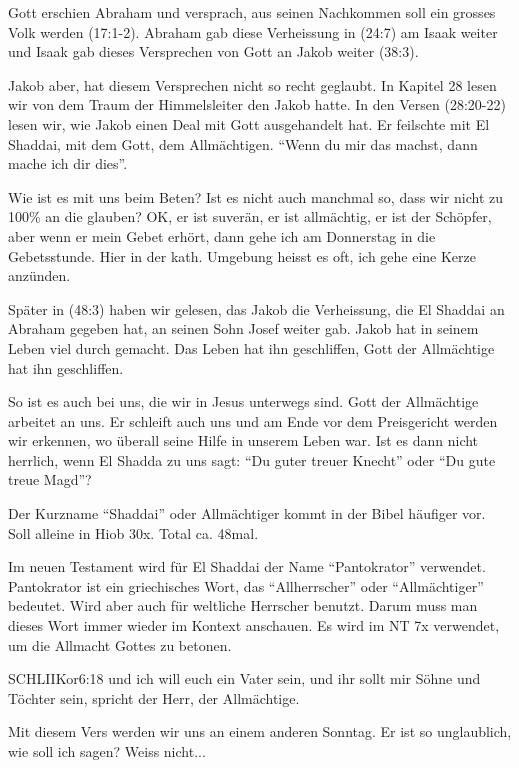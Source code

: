 \begin{otsblock}[Gottesnamen]
    Gott erschien Abraham und versprach, aus seinen Nachkommen soll ein grosses Volk werden (17:1-2). Abraham gab diese Verheissung in (24:7) am Isaak weiter und Isaak gab dieses Versprechen von Gott an Jakob weiter (38:3). 
    
    Jakob aber, hat diesem Versprechen nicht so recht geglaubt. In Kapitel 28 lesen wir von dem Traum der Himmelsleiter den Jakob hatte. In den Versen (28:20-22) lesen wir, wie Jakob einen Deal mit Gott ausgehandelt hat. Er feilschte mit El Shaddai, mit dem Gott, dem Allmächtigen. \enquote{Wenn du mir das machst, dann mache ich dir dies}. 
    
    Wie ist es mit uns beim Beten? Ist es nicht auch manchmal so, dass wir nicht zu 100\% an die  glauben? OK, er ist suverän, er ist allmächtig, er ist der Schöpfer, aber wenn er mein Gebet erhört, dann gehe ich am Donnerstag in die Gebetsstunde. Hier in der kath. Umgebung heisst es oft, ich gehe eine Kerze anzünden.

    Später in (48:3) haben wir gelesen, das Jakob die Verheissung, die El Shaddai an Abraham gegeben hat, an seinen Sohn Josef weiter gab. Jakob hat in seinem Leben viel durch gemacht. Das Leben hat ihn geschliffen, Gott der Allmächtige hat ihn geschliffen. 
    
    So ist es auch bei uns, die wir in Jesus unterwegs sind. Gott der Allmächtige arbeitet an uns. Er schleift auch uns und am Ende vor dem Preisgericht werden wir erkennen, wo überall seine Hilfe in unserem Leben war. Ist es dann nicht herrlich, wenn El Shadda zu uns sagt: \enquote{Du guter treuer Knecht} oder \enquote{Du gute treue Magd}?

    Der Kurzname \enquote{Shaddai} oder Allmächtiger kommt in der Bibel häufiger vor. Soll alleine in Hiob 30x. Total ca. 48mal. 

    Im neuen Testament wird für El Shaddai der Name \enquote{Pantokrator} verwendet. Pantokrator ist ein griechisches Wort, das \enquote{Allherrscher} oder \enquote{Allmächtiger} bedeutet. Wird aber auch für weltliche Herrscher benutzt. Darum muss man dieses Wort immer wieder im Kontext anschauen. Es wird im NT 7x verwendet, um die Allmacht Gottes zu betonen.
    \begin{bibelbox}{SCHL}{IIKor}{6:18}
        und ich will euch ein Vater sein, und ihr sollt mir Söhne und Töchter sein, spricht der Herr, der Allmächtige.
    \end{bibelbox}
    Mit diesem Vers werden wir uns an einem anderen Sonntag. Er ist so unglaublich, wie soll ich sagen? Weiss nicht...


\end{otsblock}
